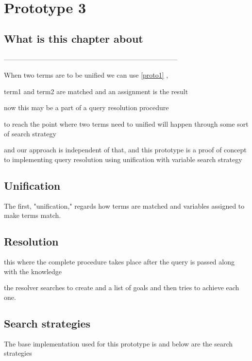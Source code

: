 \documentclass[thesis-solanki.tex]{files}
\begin{document}
\chapter{Prototype 3}{\label{proto3}}


\section{What is this chapter about}

-----------------------------------------------------------------------------

When two terms are to be unified we can use \ref{proto1} ,

term1 and term2 are matched and an assignment is the result 

now this may be a part of a query resolution procedure

to reach the point where two terms need to unified will happen through some sort of search strategy

and our approach is independent of that, and this prototype is a proof of concept to implementing query resolution using unification with
variable search strategy


\section{Unification}
The first, "unification," regards how terms are matched and variables assigned to make terms match. \cite{website:prologunification}



\section{Resolution}
this where the complete procedure takes place after the query is passed along with the knowledge 

the resolver searches to create and a list of  goals and then tries to achieve each one.

\cite{website:prologresolution}

\cite{website:resolutionlogicwiki}




\section{Search strategies}
The base implementation used for this prototype  is \cite{website:mini-prolog-hugs98} and below are the search strategies 
\end{document}
